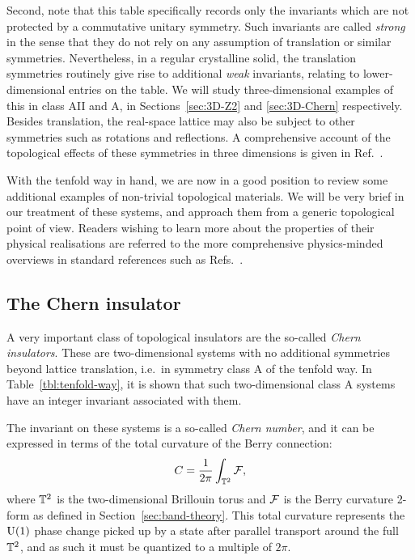 Second, note that this table specifically records only the invariants which are not protected by a commutative unitary symmetry. Such invariants are called \emph{strong} in the sense that they do not rely on any assumption of translation or similar symmetries. Nevertheless, in a regular crystalline solid, the translation symmetries routinely give rise to additional \emph{weak} invariants, relating to lower-dimensional entries on the table. We will study three-dimensional examples of this in class AII and A, in Sections~\ref{sec:3D-Z2} and \ref{sec:3D-Chern} respectively. Besides translation, the real-space lattice may also be subject to other symmetries such as rotations and reflections. A comprehensive account of the topological effects of these symmetries in three dimensions is given in Ref.~\cite{Shiozaki_AHSS}.


\label{sec:insulators}

With the tenfold way in hand, we are now in a good position to review some additional examples of non-trivial topological materials. We will be very brief in our treatment of these systems, and approach them from a generic topological point of view. Readers wishing to learn more about the properties of their physical realisations are referred to the more comprehensive physics-minded overviews in standard references such as Refs.~\cite{Bernevig_topological-insulators,Asboth_topo-course,Akhmerov_online-course}.

\subsection{The Chern insulator}\label{sec:Chern}

A very important class of topological insulators are the so-called \emph{Chern insulators}. These are two-dimensional systems with no additional symmetries beyond lattice translation, i.e.\ in symmetry class A of the tenfold way. In Table~\ref{tbl:tenfold-way}, it is shown that such two-dimensional class A systems have an integer invariant associated with them.

The invariant on these systems is a so-called \emph{Chern number}, and it can be expressed in terms of the total curvature of the Berry connection:
\begin{equation}\label{eq:Chern-number}
	C = \frac{1}{2\pi}\int_{\mathbb{T}^2} \mathcal{F},
\end{equation}
where $\mathbb{T}^2$ is the two-dimensional Brillouin torus and $\mathcal{F}$ is the Berry curvature 2-form as defined in Section~\ref{sec:band-theory}. This total curvature represents the $\operatorname{U}(1)$ phase change picked up by a state after parallel transport around the full $\mathbb{T}^2$, and as such it must be quantized to a multiple of $2\pi$.

